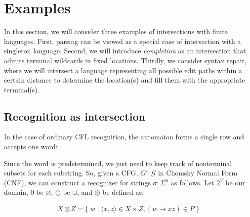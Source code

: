 \documentclass[sigplan,review,acmsmall,nonacm,screen,anonymous]{acmart}\settopmatter{printfolios=false,printccs=false,printacmref=false}
\begin{document}
\section{Examples}

In this section, we will consider three examples of intersections with finite languages. First, parsing can be viewed as a special case of intersection with a singleton language. Second, we will introduce \textit{completion} as an intersection that admits terminal wildcards in fixed locations. Thirdly, we consider syntax repair, where we will intersect a language representing all possible edit paths within a certain distance to determine the location(s) and fill them with the appropriate terminal(s).

\subsection{Recognition as intersection}

In the case of ordinary CFL recognition, the automaton forms a single row and accepts one word:

\begin{figure}[H]
\end{figure}

Since the word is predetermined, we just need to keep track of nonterminal subsets for each substring. So, given a CFG, $G' : \mathcal{G}$ in Chomsky Normal Form (CNF), we can construct a recognizer for strings $\sigma: \Sigma^n$ as follows. Let $2^V$ be our domain, $0$ be $\varnothing$, $\oplus$ be $\cup$, and $\otimes$ be defined as:\vspace{-10pt}

\begin{align}
  X \otimes Z = \big\{\;w \mid \langle x, z\rangle \in X \times Z, (w\rightarrow xz) \in P\;\big\}
\end{align}
\end{document}
